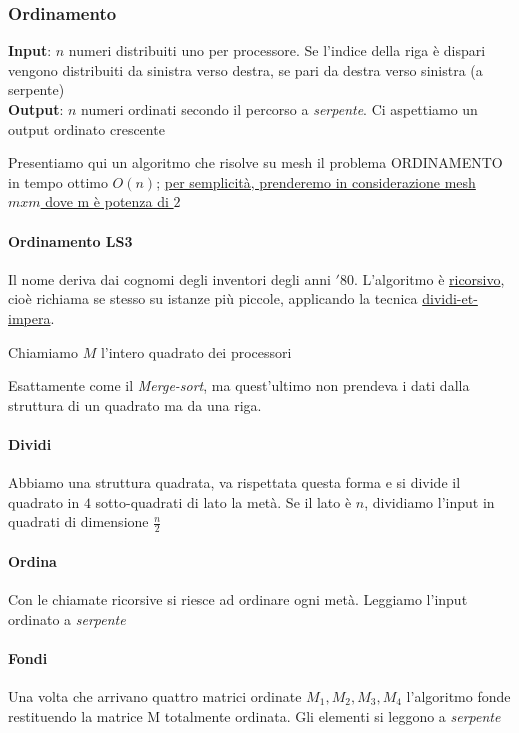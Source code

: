 \subsubsection{Ordinamento}
\textbf{Input}: $n$ numeri distribuiti uno per processore. Se l'indice della riga è dispari vengono distribuiti da sinistra verso destra, se pari da destra verso sinistra (a serpente)\\
\textbf{Output}: $n$ numeri ordinati secondo il percorso a \textit{serpente}. Ci aspettiamo un output ordinato crescente

Presentiamo qui un algoritmo che risolve su mesh il problema ORDINAMENTO in tempo ottimo $O(n)$; \uline{per semplicità, prenderemo in considerazione mesh $mxm$ dove m è potenza di $2$}

\paragraph{Ordinamento LS3}
Il nome deriva dai cognomi degli inventori degli anni $'80$. L'algoritmo è \uline{ricorsivo}, cioè richiama se stesso su istanze più piccole, applicando la tecnica \uline{dividi-et-impera}.

Chiamiamo $M$ l'intero quadrato dei processori

Esattamente come il \textit{Merge-sort}, ma quest'ultimo non prendeva i dati dalla struttura di un quadrato ma da una riga.

\paragraph{Dividi}
Abbiamo una struttura quadrata, va rispettata questa forma e si divide il quadrato in $4$ sotto-quadrati di lato la metà. Se il lato è $n$, dividiamo l'input in quadrati di dimensione $\frac{n}{2}$


\paragraph{Ordina}
Con le chiamate ricorsive si riesce ad ordinare ogni metà. Leggiamo l'input ordinato a \textit{serpente}


\paragraph{Fondi}
Una volta che arrivano quattro matrici ordinate $M_1, M_2, M_3, M_4$ l'algoritmo fonde restituendo la matrice M totalmente ordinata. Gli elementi si leggono a \textit{serpente}

